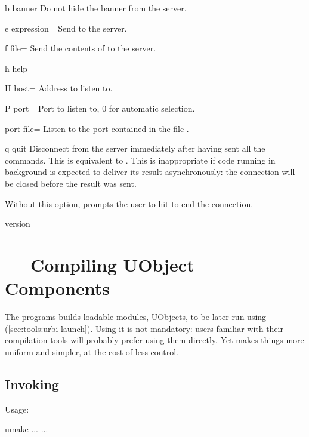 \begin{options}
\item[b]{banner} Do not hide the banner from the server.
\item[e]{expression=} Send  to the server.
\item[f]{file=} Send the contents of  to the
  server.
\item[h]{help} \optionHelp
\item[H]{host=} Address to listen to.
\item[P]{port=} Port to listen to, 0 for automatic
  selection.
\item{port-file=} Listen to the port contained in the file
  .
\item[q]{quit} Disconnect from the server immediately after having
  sent all the commands.  This is equivalent to .
  This is inappropriate if code running in background is expected to
  deliver its result asynchronously: the connection will be closed
  before the result was sent.

  Without this option,  prompts the user to hit
   to end the connection.
\item{version} \optionVersion
\end{options}


\section{ --- Compiling UObject Components}
\label{sec:tools:umake}

The  programs builds loadable modules, UObjects, to be
later run using 
(\autoref{sec:tools:urbi-launch}).  Using it is not mandatory: users
familiar with their compilation tools will probably prefer using them
directly.  Yet  makes things more uniform and simpler,
at the cost of less control.

\subsection{Invoking }
\label{sec:tools:umake:invoke}

Usage:
\begin{shell}
umake ... ...
\end{shell}

